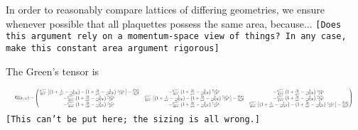 \documentclass[aps,pra,superscriptaddress,twocolumn]{revtex4-1}
\newcommand{\commentSB}[1]{\texttt{\color{blue}[#1]}}
\begin{document}
In order to reasonably compare lattices of differing geometries, we ensure whenever possible that all plaquettes possess the same area, because...
\commentSB{Does this argument rely on a momentum-space view of things? In any case, make this constant area argument rigorous}

The Green's tensor is 



\begin{equation} \resizebox{1.0\hsize}{!}{
    $ \textbf{G}(\textbf{r},\omega) = \begin{pmatrix}
        \frac{e^{i\omega r}}{4\pi r} \left[ \left( 1 + \frac{i}{\omega r} - \frac{1}{\omega^2 r^2} \right) - \left( 1 + \frac{3i}{\omega r} - \frac{3}{\omega^2 r^2} \right) \frac{r_x r_x}{r^2} \right] - \frac{\delta(\textbf{r})}{3\omega^2}
        & -\frac{e^{i\omega r}}{4\pi r} \left( 1 + \frac{3i}{\omega r} - \frac{3}{\omega^2 r^2} \right) \frac{r_x r_y}{r^2}
        & -\frac{e^{i\omega r}}{4\pi r}  \left( 1 + \frac{3i}{\omega r} - \frac{3}{\omega^2 r^2} \right) \frac{r_x r_z}{r^2}  \\
        - \frac{e^{i\omega r}}{4\pi r} \left( 1 + \frac{3i}{\omega r} - \frac{3}{\omega^2 r^2} \right) \frac{r_y r_x}{r^2}  
        & \frac{e^{i\omega r}}{4\pi r} \left[ \left( 1 + \frac{i}{\omega r} - \frac{1}{\omega^2 r^2} \right) - \left( 1 + \frac{3i}{\omega r} - \frac{3}{\omega^2 r^2} \right) \frac{r_y r_y}{r^2} \right] - \frac{\delta(\textbf{r})}{3\omega^2} 
        & - \frac{e^{i\omega r}}{4\pi r} \left( 1 + \frac{3i}{\omega r} - \frac{3}{\omega^2 r^2} \right) \frac{r_y r_z}{r^2} \\
        - \frac{e^{i\omega r}}{4\pi r} \left( 1 + \frac{3i}{\omega r} - \frac{3}{\omega^2 r^2} \right) \frac{r_z r_x}{r^2} 
        & - \frac{e^{i\omega r}}{4\pi r} \left( 1 + \frac{3i}{\omega r} - \frac{3}{\omega^2 r^2} \right) \frac{r_z r_y}{r^2} 
        & \frac{e^{i\omega r}}{4\pi r} \left[ \left( 1 + \frac{i}{\omega r} - \frac{1}{\omega^2 r^2} \right) - \left( 1 + \frac{3i}{\omega r} - \frac{3}{\omega^2 r^2} \right) \frac{r_z r_z}{r^2} \right] - \frac{\delta(\textbf{r})}{3\omega^2}
    \end{pmatrix} $
    \label{eqn:green}
    }\end{equation}
    \commentSB{This can't be put here; the sizing is all wrong.}
\end{document}
